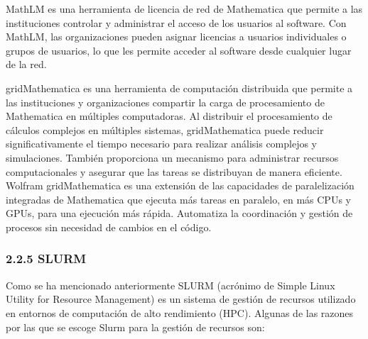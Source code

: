 \begin{spacing}{1.5}
    MathLM es una herramienta de licencia de red de Mathematica que permite a las instituciones controlar y administrar el acceso de los usuarios al software. Con MathLM, las organizaciones pueden asignar licencias a usuarios individuales o grupos de usuarios, lo que les permite acceder al software desde cualquier lugar de la red. \cite{Wolfram-mathlm-1}
    
    gridMathematica es una herramienta de computación distribuida que permite a las instituciones y organizaciones compartir la carga de procesamiento de Mathematica en múltiples computadoras. Al distribuir el procesamiento de cálculos complejos en múltiples sistemas, gridMathematica puede reducir significativamente el tiempo necesario para realizar análisis complejos y simulaciones. También proporciona un mecanismo para administrar recursos computacionales y asegurar que las tareas se distribuyan de manera eficiente. Wolfram gridMathematica es una extensión de las capacidades de paralelización integradas de Mathematica que ejecuta más tareas en paralelo, en más CPUs y GPUs, para una ejecución más rápida. Automatiza la coordinación y gestión de procesos sin necesidad de cambios en el código. \cite{Wolfram-grid-1}

    \subsubsection{2.2.5 SLURM}

    Como se ha mencionado anteriormente SLURM (acrónimo de Simple Linux Utility for Resource Management) es un sistema de gestión de recursos utilizado en entornos de computación de alto rendimiento (HPC). Algunas de las razones por las que se escoge Slurm para la gestión de recursos son:


\end{spacing}
